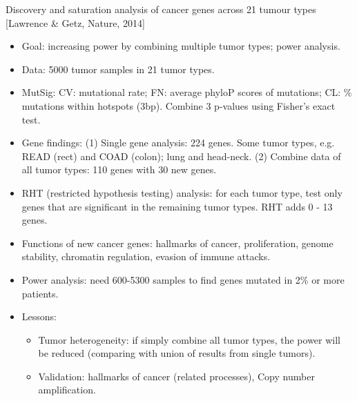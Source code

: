 \documentclass{report}
\begin{document}
Discovery and saturation analysis of cancer genes across 21 tumour types [Lawrence \& Getz, Nature, 2014]
\begin{itemize}
	\item Goal: increasing power by combining multiple tumor types; power analysis. 
	
	\item Data: 5000 tumor samples in 21 tumor types. 
	
	\item MutSig: CV: mutational rate; FN: average phyloP scores of mutations; CL: \% mutations within hotspots (3bp). Combine 3 p-values using Fisher's exact test. 
	
	\item Gene findings: (1) Single gene analysis: 224 genes. Some tumor types, e.g. READ (rect) and COAD (colon); lung and head-neck. (2) Combine data of all tumor types: 110 genes with 30 new genes. 
	
	\item RHT (restricted hypothesis testing) analysis: for each tumor type, test only genes that are significant in the remaining tumor types. RHT adds 0 - 13 genes.
	
	\item Functions of new cancer genes: hallmarks of cancer, proliferation, genome stability, chromatin regulation, evasion of immune attacks. 
	
	\item Power analysis: need 600-5300 samples to find genes mutated in 2\% or more patients. 
	
	\item Lessons: 
	\begin{itemize}
		\item Tumor heterogeneity: if simply combine all tumor types, the power will be reduced (comparing with union of results from single tumors). 
		
		\item Validation: hallmarks of cancer (related processes), Copy number amplification. 
		
	\end{itemize} 
\end{itemize}
\end{document}

